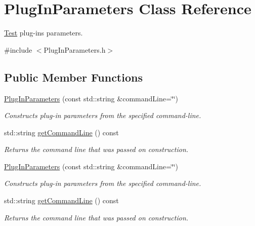 \hypertarget{class_plug_in_parameters}{\section{Plug\+In\+Parameters Class Reference}
\label{class_plug_in_parameters}
}


\hyperlink{class_test}{Test} plug-\/ins parameters.  




{\ttfamily \#include $<$Plug\+In\+Parameters.\+h$>$}

\subsection*{Public Member Functions}
\begin{DoxyCompactItemize}
\item 
\hypertarget{class_plug_in_parameters_adde8842ebd4c67c1a8d1862d3cb58c4e}{\hyperlink{class_plug_in_parameters_adde8842ebd4c67c1a8d1862d3cb58c4e}{Plug\+In\+Parameters} (const std\+::string \&command\+Line=\char`\"{}\char`\"{})}\label{class_plug_in_parameters_adde8842ebd4c67c1a8d1862d3cb58c4e}

\begin{DoxyCompactList}\small\item\em Constructs plug-\/in parameters from the specified command-\/line. \end{DoxyCompactList}\item 
\hypertarget{class_plug_in_parameters_aad9dfbb3f1745b72154ab6b70948d629}{std\+::string \hyperlink{class_plug_in_parameters_aad9dfbb3f1745b72154ab6b70948d629}{get\+Command\+Line} () const }\label{class_plug_in_parameters_aad9dfbb3f1745b72154ab6b70948d629}

\begin{DoxyCompactList}\small\item\em Returns the command line that was passed on construction. \end{DoxyCompactList}\item 
\hypertarget{class_plug_in_parameters_acbf183c92faaa4e17dc66dec87ddc033}{\hyperlink{class_plug_in_parameters_acbf183c92faaa4e17dc66dec87ddc033}{Plug\+In\+Parameters} (const std\+::string \&command\+Line=\char`\"{}\char`\"{})}\label{class_plug_in_parameters_acbf183c92faaa4e17dc66dec87ddc033}

\begin{DoxyCompactList}\small\item\em Constructs plug-\/in parameters from the specified command-\/line. \end{DoxyCompactList}\item 
\hypertarget{class_plug_in_parameters_aad9dfbb3f1745b72154ab6b70948d629}{std\+::string \hyperlink{class_plug_in_parameters_aad9dfbb3f1745b72154ab6b70948d629}{get\+Command\+Line} () const }\label{class_plug_in_parameters_aad9dfbb3f1745b72154ab6b70948d629}

\begin{DoxyCompactList}\small\item\em Returns the command line that was passed on construction. \end{DoxyCompactList}\end{DoxyCompactItemize}


